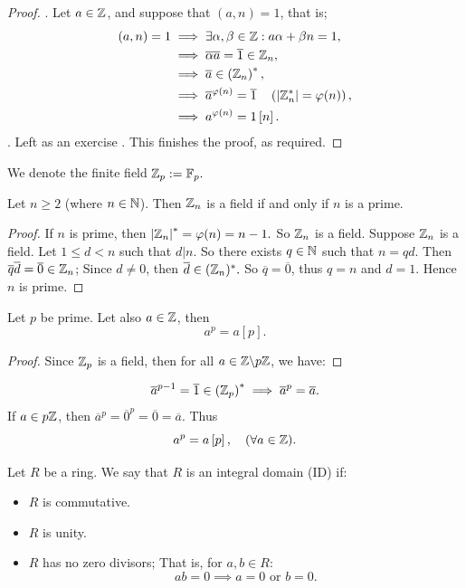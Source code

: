 \begin{proof}
   . Let $a \in \mathbb{Z}$, and suppose that $(a, n) = 1$, that is; 
\begin{align*}
  (a, n)  = 1 
  & \implies 
  \exists \alpha, \beta \in  \mathbb{Z}: a \alpha + \beta n = 1, \\
  & \implies 
  \overline{\alpha} \overline{a} = \overline{1} \in  
  \mathbb{Z}_{n}, 
  \\
  & \implies 
  \overline{a} \in  
  \left( \mathbb{Z}_{n} \right) ^{*},
  \\
  & \implies 
  \overline{a}^{\varphi(n) } = 
  \overline{1} \quad \left( \left| \mathbb{Z}_{n}^{*} \right| =
  \varphi(n) \right), \\
  & \implies 
  a ^{\varphi(n) } = 
  1 \left[  n \right].
\end{align*}
 . Left as an exercise \textbf{}. This finishes
the proof, as required.
\end{proof}
\divider
We denote the finite field $\mathbb{Z}_{p} := \mathbb{F}_{p}.$ \\
\begin{proposition}[]
Let $n \geq 2$ (where $
n \in  \mathbb{N}$). Then $\mathbb{Z}_{n}$ is a field if and only if 
$n$ is a prime.
\end{proposition}
\begin{proof}
If $n$ is prime, then $\left| \mathbb{Z}_{n} \right|  ^{*} = 
\varphi(n)  = n-1.$ So $\mathbb{Z}_n$ is a field. Suppose $\mathbb{Z}_n $ is a 
field. Let $1 \leq  d < n$ such that $d|n$. So there exists 
$q \in  \mathbb{N}$ such that $ n = q d.$ Then $\overline{q} \overline{d}= 
\overline{0} \in  \mathbb{Z}_{n}$; Since $d \neq 0$, then 
$\overline{d} \in  (\mathbb{Z}_n ) ^{*}.$  So $\overline{q} = \overline{0}$, thus
$q = n$ and $d= 1$. Hence $n$ is prime.
\end{proof}
\begin{theorem}
  Let $p$ be prime. Let also $a \in  \mathbb{Z}$, then 
  \[
    a ^{p} = a \left[ p \right].
  \]
\end{theorem}
\begin{proof}
  Since $\mathbb{Z}_{p}$ is a field, then for all $a \in  \mathbb{Z} \backslash  p \mathbb{Z}$, 
  we have:
\end{proof}
\[
\overline{a}^{p-1} = \overline{1} \in  
\left( \mathbb{Z}_{p} \right) ^{*} \implies 
\overline{a}^{p} = \overline{a}.
\]
If $a \in  p\mathbb{Z}$, then $\overline{a}^{p} = \overline{0}^{p} = \overline{0}
= \overline{a}$. Thus
\[
  a ^{p} = a \left[ p \right], \quad ( 
  \forall a \in  \mathbb{Z}).
\]
\begin{definition}[]
Let $R$ be a ring. We say that $R$ is an integral domain 
(ID) if:
\begin{itemize}
  \item[\ding{172} ] $R$ is
    commutative.
  \item[\ding{173} ] $R$ is
    unity.
  \item[\ding{174} ] $R$ has 
    no zero divisors; That is, for $a, b \in  R$:
    \[
    ab = 0 \implies a = 0 \text{ or }  b = 0.
    \]
\end{itemize}
\end{definition}
